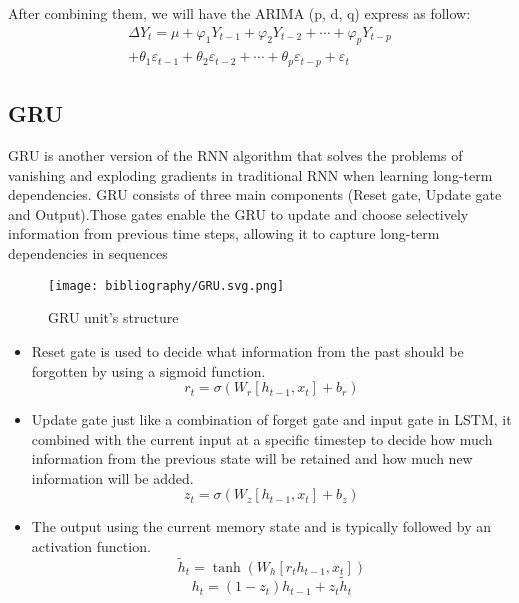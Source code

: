 \documentclass{ieeeojies}
\begin{document}
After combining them, we will have the ARIMA (p, d, q) express as follow:
\begin{align*}
\Delta Y_t = \mu + \varphi_1 Y_{t-1} + \varphi_2 Y_{t-2} + \cdots + \varphi_p Y_{t-p} \\
+ \theta_1 \varepsilon_{t-1} + \theta_2 \varepsilon_{t-2} + \cdots + \theta_p \varepsilon_{t-p} + \varepsilon_t
\end{align*}

\subsection{GRU}
GRU is another version of the RNN algorithm that solves the problems of vanishing and exploding gradients in traditional RNN when learning long-term dependencies. GRU consists of three main components (Reset gate, Update gate and Output).Those gates enable the GRU to update and choose selectively
information from previous time steps, allowing it to capture long-term dependencies in sequences \cite{b9}
\begin{figure}[H]
    \centering
    \begin{minipage}{0.45\textwidth}
    \centering
    \texttt{[image: bibliography/GRU.svg.png]}    
    \label{fig:1}
    \caption{GRU unit's structure}
    \end{minipage}
\end{figure}
\begin{itemize}
    \item Reset gate is used to decide what information from the past should be forgotten by using a sigmoid function.\\
        \[r_t = \sigma(W_r [h_{t-1}, x_t] + b_r) \]
    
    \item Update gate just like a combination of forget gate and input gate in LSTM, it combined with the current input at a specific timestep to decide how much information from the previous state will be retained and how much new information will be added.\\
        \[ z_t = \sigma(W_z [h_{t-1}, x_t] + b_z) \]
    \item The output using the current memory state  and is typically followed by an activation function.\\
        \[ \tilde{h}_t = \tanh(W_h [r_t h_{t-1}, x_t]) \]
        \[ h_t = (1 - z_t) h_{t-1} + z_t \tilde{h}_t \]
\end{itemize}
\end{document}
